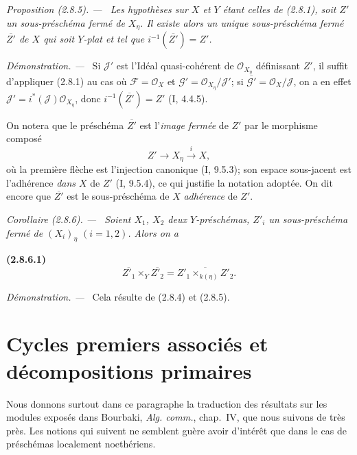 \documentclass[10pt,oneside]{book}
\newcommand{\oldpage}[2][]{%
  \setcounter{footnote}{0}%
  \marginpar{\scriptsize\textbf{#1}~|~#2}\ignorespaces}
\newenvironment{env}[1][]{\par\medskip\noindent\textbf{(#1)}\ }{\par}
\newenvironment{proposition}[1][]{%
  \par\medskip\noindent\itshape Proposition (#1). ---\ }{\par}
\newenvironment{corollary}[1][]{%
  \par\medskip\noindent\itshape Corollaire (#1). ---\ }{\par}
\newenvironment{proof}{%
  \par\medskip\noindent\textit{Démonstration. ---\ }}{\par}
\begin{document}
\begin{proposition}[2.8.5]
\label{IV.2.8.5-fr}
Les hypothèses sur $X$ et $Y$ étant celles de (2.8.1), soit $Z'$ un
sous-préschéma fermé de $X_\eta$. Il existe alors un unique sous-préschéma
fermé $\overline{Z'}$ de $X$ qui soit $Y$-plat et tel que
$i^{-1}(\overline{Z'})=Z'$.
\end{proposition}

\begin{proof}
Si $\mathcal J'$ est l'Idéal quasi-cohérent de $\mathcal O_{X_\eta}$
définissant $Z'$, il suffit d'appliquer (2.8.1) au cas où
$\mathcal F=\mathcal O_X$ et
$\mathcal G'=\mathcal O_{X_\eta}/\mathcal J'$; si
$\overline{\mathcal G'}=\mathcal O_X/\mathcal J$, on a en effet
$\mathcal J'=i^*(\mathcal J)\mathcal O_{X_\eta}$, donc
$i^{-1}(\overline{Z'})=Z'$ (I, 4.4.5).
\end{proof}

On notera que le préschéma $\overline{Z'}$ est l'\emph{image fermée} de $Z'$
par le morphisme composé
\[
Z'\longrightarrow X_\eta\xrightarrow{i}X,
\]
où la première flèche est l'injection canonique (I, 9.5.3); son espace
sous-jacent est l'adhérence \emph{dans $X$} de $Z'$ (I, 9.5.4), ce qui
justifie la notation adoptée. On dit encore que $\overline{Z'}$ est le
sous-préschéma de $X$ \emph{adhérence} de $Z'$.

\begin{corollary}[2.8.6]
\label{IV.2.8.6-fr}
Soient $X_1$, $X_2$ deux $Y$-préschémas, $Z'_i$ un sous-préschéma fermé de
$(X_i)_\eta$ $(i=1,2)$. Alors on a
\end{corollary}

\begin{env}[2.8.6.1]
\label{IV.2.8.6.1-fr}
\[
\overline{Z'_1}\times_Y\overline{Z'_2}
=\overline{Z'_1\times_{k(\eta)}Z'_2}.
\]
\end{env}

\begin{proof}
Cela résulte de (2.8.4) et (2.8.5).
\end{proof}

\oldpage[IV-2]{36}
\section{Cycles premiers associés et décompositions primaires}

Nous donnons surtout dans ce paragraphe la traduction des résultats sur les
modules exposés dans Bourbaki, \emph{Alg. comm.}, chap.~IV, que nous suivons de
très près. Les notions qui suivent ne semblent guère avoir d'intérêt que dans
le cas de préschémas localement noethériens.
\end{document}
